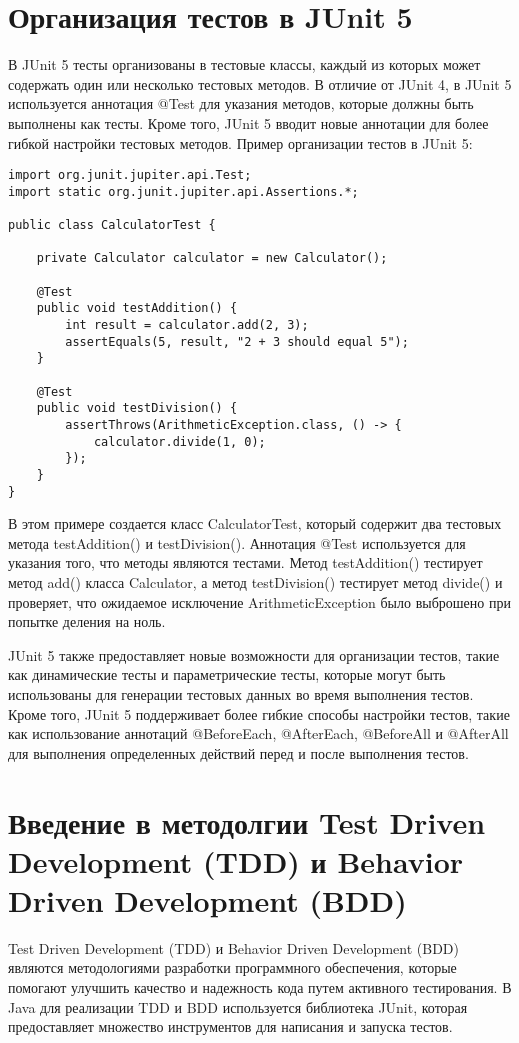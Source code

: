 \section{Организация тестов в JUnit 5}
В JUnit 5 тесты организованы в тестовые классы, каждый из которых может содержать один или несколько тестовых методов. В отличие от JUnit 4, в JUnit 5 используется аннотация @Test для указания методов, которые должны быть выполнены как тесты. Кроме того, JUnit 5 вводит новые аннотации для более гибкой настройки тестовых методов.
Пример организации тестов в JUnit 5:
\begin{lstlisting}
import org.junit.jupiter.api.Test;
import static org.junit.jupiter.api.Assertions.*;

public class CalculatorTest {

    private Calculator calculator = new Calculator();

    @Test
    public void testAddition() {
        int result = calculator.add(2, 3);
        assertEquals(5, result, "2 + 3 should equal 5");
    }

    @Test
    public void testDivision() {
        assertThrows(ArithmeticException.class, () -> {
            calculator.divide(1, 0);
        });
    }
}
\end{lstlisting}
В этом примере создается класс CalculatorTest, который содержит два тестовых метода testAddition() и testDivision(). Аннотация @Test используется для указания того, что методы являются тестами. Метод \newline testAddition() тестирует метод add() класса Calculator, а метод \newline testDivision() тестирует метод divide() и проверяет, что ожидаемое исключение \newline ArithmeticException было выброшено при попытке деления на ноль.

JUnit 5 также предоставляет новые возможности для организации тестов, такие как динамические тесты и параметрические тесты, которые могут быть использованы для генерации тестовых данных во время выполнения тестов. Кроме того, JUnit 5 поддерживает более гибкие способы настройки тестов, такие как использование аннотаций @BeforeEach, @AfterEach, @BeforeAll и @AfterAll для выполнения определенных действий перед и после выполнения тестов.

\section{Введение в методолгии Test Driven Development (TDD) и Behavior Driven Development (BDD)}
Test Driven Development (TDD) и Behavior Driven Development (BDD) являются методологиями разработки программного обеспечения, которые помогают улучшить качество и надежность кода путем активного тестирования. В Java для реализации TDD и BDD используется библиотека JUnit, которая предоставляет множество инструментов для написания и запуска тестов.

